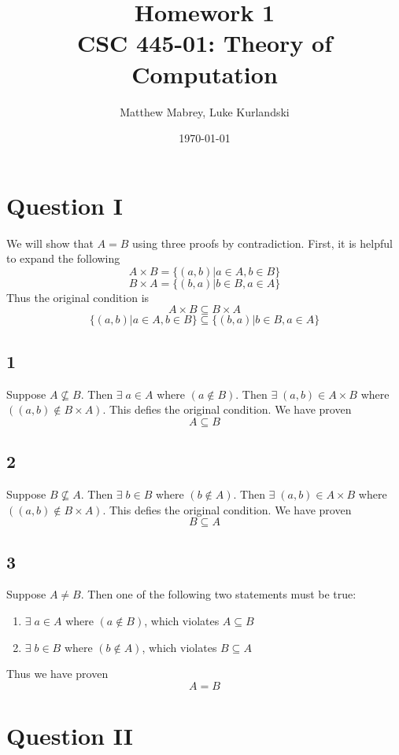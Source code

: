 \documentclass{article}
\title{Homework 1\\[0.2em]\smaller{}CSC 445-01: Theory of Computation}
\author{Matthew Mabrey, Luke Kurlandski}
\date{\today}
\begin{document}
\maketitle

\section*{Question I}

We will show that $A=B$ using three proofs by contradiction. First, it is helpful to expand the following
$$
A \times B = \biggr \{ (a,b) | a \in A, b \in B \biggr \}
$$
$$
B \times A = \biggr \{ (b,a) | b \in B, a \in A \biggr \}
$$
Thus the original condition is
$$
A \times B \subseteq B \times A
$$
$$
\biggr \{ (a,b) | a \in A, b \in B \biggr \} \subseteq \biggr \{ (b,a) | b \in B, a \in A \biggr \}
$$

\subsection*{1}
Suppose $A \not \subseteq B$. Then $\exists \; a \in A $ where $ (a \not \in B) $. Then $\exists \; (a, b) \in A \times  B $ where $ ((a, b) \not \in B \times  A ) $. This defies the original condition. We have proven
$$A \subseteq B$$

\subsection*{2}
Suppose $B \not \subseteq A$. Then $\exists \; b \in B $ where $ (b \not \in A) $. Then $\exists \; (a, b) \in A \times  B $ where $ ((a, b) \not \in B \times  A ) $. This defies the original condition. We have proven
$$B \subseteq A$$

\subsection*{3}
Suppose $A \neq B$. Then one of the following two statements must be true:
\begin{enumerate} 
\item $\exists \; a \in A $ where $ (a \not \in B) $, which violates $A \subseteq B$
\item $\exists \; b \in B $ where $ (b \not \in A) $, which violates $B \subseteq A$
\end{enumerate}
Thus we have proven
$$A = B$$


\section*{Question II}
\end{document}
